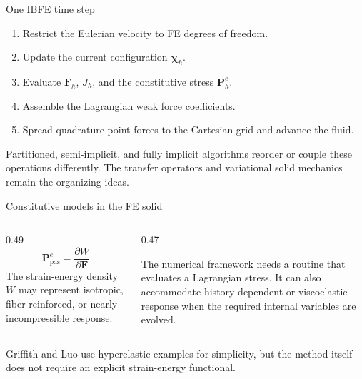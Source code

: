 \documentclass[aspectratio=169,11pt]{beamer}
\newcommand{\Ften}{\bm{F}}
\newcommand{\Pten}{\bm{P}^{e}}
\begin{document}
\begin{frame}{One IBFE time step}
\begin{enumerate}\itemsep7pt
  \item Restrict the Eulerian velocity to FE degrees of freedom.
  \item Update the current configuration \(\bm{\chi}_h\).
  \item Evaluate \(\Ften_h\), \(J_h\), and the constitutive stress \(\Pten_h\).
  \item Assemble the Lagrangian weak force coefficients.
  \item Spread quadrature-point forces to the Cartesian grid and advance the fluid.
\end{enumerate}

\medskip
\begin{punchbox}
Partitioned, semi-implicit, and fully implicit algorithms reorder or couple these operations differently. The transfer operators and variational solid mechanics remain the organizing ideas.
\end{punchbox}
\end{frame}

\begin{frame}{Constitutive models in the FE solid}
\begin{columns}[T,onlytextwidth]
\begin{column}{0.49\textwidth}
\[
\Pten_{\mathrm{pas}}=\frac{\partial W}{\partial\Ften}
\]
The strain-energy density \(W\) may represent isotropic, fiber-reinforced, or nearly incompressible response.
\end{column}
\begin{column}{0.47\textwidth}

The numerical framework needs a routine that evaluates a Lagrangian stress. It can also accommodate history-dependent or viscoelastic response when the required internal variables are evolved.
\end{column}
\end{columns}

\medskip
\begin{punchbox}
Griffith and Luo use hyperelastic examples for simplicity, but the method itself does not require an explicit strain-energy functional.
\end{punchbox}
\end{frame}
\end{document}
